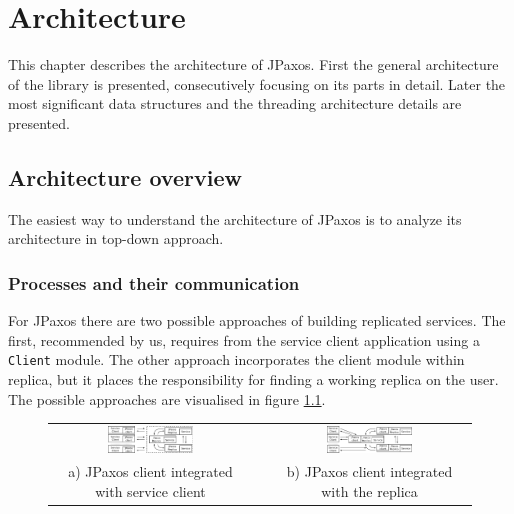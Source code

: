 \chapter{Architecture}

This chapter describes the architecture of JPaxos.
First the general architecture of the library is presented, consecutively focusing on its parts in detail.
Later the most significant data structures and the threading architecture details are presented.

\section{Architecture overview}
\indent\par
The easiest way to understand the architecture of JPaxos is to analyze its architecture in top-down approach.

\subsection{Processes and their communication}

For JPaxos there are two possible approaches of building replicated services. The first, recommended by us, 
requires from the service client application using a \texttt{Client} module. %
The other approach incorporates the client module within replica, but 
it places the responsibility for finding a working replica on the user. %
The possible approaches are visualised in figure \ref{fig:jpaxos_processes}.

\begin{figure}[h]
 \begin{tabular}{ccc}
  \includegraphics[width=0.44\textwidth]{architecture/userArchitecture1.pdf}
  &
  \hspace{0.02\textwidth}
  &
  \includegraphics[width=0.44\textwidth]{architecture/userArchitecture2.pdf}
  \\ 
  \scriptsize a) JPaxos client integrated with service client
  & & 
  \scriptsize b) JPaxos client integrated with the replica\\
 \end{tabular}
 \label{fig:jpaxos_processes}
\end{figure}

